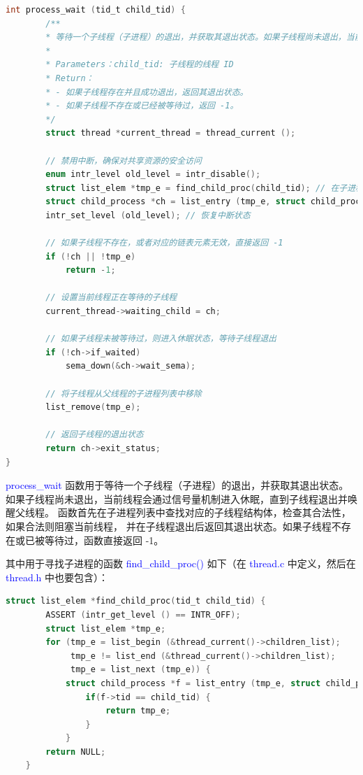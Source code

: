 \documentclass[14pt,a4paper,UTF8,twoside]{article}
\renewcommand{\texttt}[1]{\textcolor{blue}{\ttfamily #1}}
\begin{document}
\begin{lstlisting}[language=C, title = process\_wait()]
    int process_wait (tid_t child_tid) {
        /**
        * 等待一个子线程（子进程）的退出，并获取其退出状态。如果子线程尚未退出，当前线程将进入休眠状态，直到子线程退出。
        * 
        * Parameters：child_tid: 子线程的线程 ID
        * Return：
        * - 如果子线程存在并且成功退出，返回其退出状态。
        * - 如果子线程不存在或已经被等待过，返回 -1。
        */
        struct thread *current_thread = thread_current ();

        // 禁用中断，确保对共享资源的安全访问
        enum intr_level old_level = intr_disable();
        struct list_elem *tmp_e = find_child_proc(child_tid); // 在子进程列表中查找子线程对应的链表元素
        struct child_process *ch = list_entry (tmp_e, struct child_process, child_elem); // 提取子线程的状态结构体
        intr_set_level (old_level); // 恢复中断状态

        // 如果子线程不存在，或者对应的链表元素无效，直接返回 -1
        if (!ch || !tmp_e)
            return -1;
    
        // 设置当前线程正在等待的子线程
        current_thread->waiting_child = ch;
    
        // 如果子线程未被等待过，则进入休眠状态，等待子线程退出
        if (!ch->if_waited)
            sema_down(&ch->wait_sema);
    
        // 将子线程从父线程的子进程列表中移除
        list_remove(tmp_e);
    
        // 返回子线程的退出状态
        return ch->exit_status;
}
\end{lstlisting}

\begin{ctt}
    \texttt{process\_wait} 函数用于等待一个子线程（子进程）的退出，并获取其退出状态。
    如果子线程尚未退出，当前线程会通过信号量机制进入休眠，直到子线程退出并唤醒父线程。
    函数首先在子进程列表中查找对应的子线程结构体，检查其合法性，如果合法则阻塞当前线程，
    并在子线程退出后返回其退出状态。如果子线程不存在或已被等待过，函数直接返回 -1。
\end{ctt}

其中用于寻找子进程的函数 \texttt{find\_child\_proc()} 如下（在 \texttt{thread.c} 中定义，然后在 \texttt{thread.h} 中也要包含）：

\begin{lstlisting}[language=C, title = find\_child\_proc()]
    struct list_elem *find_child_proc(tid_t child_tid) {
        ASSERT (intr_get_level () == INTR_OFF);
        struct list_elem *tmp_e;
        for (tmp_e = list_begin (&thread_current()->children_list);
             tmp_e != list_end (&thread_current()->children_list);
             tmp_e = list_next (tmp_e)) {
            struct child_process *f = list_entry (tmp_e, struct child_process, child_elem);
                if(f->tid == child_tid) {
                    return tmp_e;
                }
            }
        return NULL;
    }
\end{lstlisting}
\end{document}
